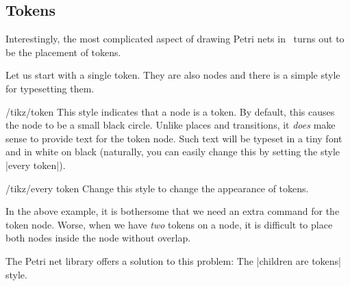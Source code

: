 \subsection{Tokens}
\label{section-tokens}

Interestingly, the most complicated aspect of drawing Petri nets in
\tikzname\ turns out to be the placement of tokens.

Let us start with a single token. They are also nodes and there is a
simple style for typesetting them.

\begin{stylekey}{/tikz/token}
  This style indicates that a node is a token. By default, this causes
  the node to be a small black circle. Unlike places and transitions,
  it \emph{does} make sense to provide text for the token node. Such
  text will be typeset in a tiny font and in white on black
  (naturally, you can easily change this by setting the style
  |every token|).

\begin{codeexample}[]
\end{codeexample}
  \begin{stylekey}{/tikz/every token}
    Change this style to change the appearance of tokens.
  \end{stylekey}
\end{stylekey}

In the above example, it is bothersome that we need an extra command
for the token node. Worse, when we have \emph{two} tokens on a node,
it is difficult to place both nodes inside the node without overlap.

The Petri net library offers a solution to this problem: The
|children are tokens| style.


